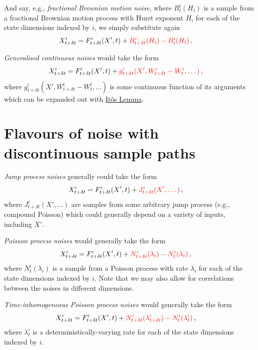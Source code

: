 \documentclass{book}
\begin{document}
And say, e.g., \emph{fractional Brownian motion noise}, where $B^i_{t}({H_i})$ is a sample from a fractional Brownian motion process with Hurst exponent $H_i$ for each of the state dimensions indexed by $i$, we simply substitute again
\begin{align}
& X^i_{t+\delta t} = F^i_{t+\delta t}(X', t) + \textcolor{red}{B^i_{t+\delta t}({H_i})-B^i_{t}({H_i})}\,.
\end{align}

\emph{Generalised continuous noises} would take the form
\begin{align}
& X^i_{t+\delta t} = F^i_{t+\delta t}(X', t) + \textcolor{red}{g^i_{t+\delta t}(X', W^i_{t+\delta t}-W^i_t, \dots)}\,,
\end{align}
where $g^i_{t+\delta t}(X', W^i_{t+\delta t}-W^i_t, \dots)$ is some continuous function of its arguments which can be expanded out with \href{https://en.wikipedia.org/wiki/It\%C3\%B4\%27s_lemma}{Itôs Lemma}.


\section{\sffamily Flavours of noise with discontinuous sample paths}

\emph{Jump process noises} generally could take the form
\begin{align}
& X^i_{t+\delta t} = F^i_{t+\delta t}(X', t) + \textcolor{red}{J^i_{t+\delta t}(X', \dots )}\,,
\end{align}
where $J^i_{t+\delta t}(X', \dots )$ are samples from some arbitrary jump process (e.g., compound Poisson) which could generally depend on a variety of inputs, including $X'$. 

\emph{Poisson process noises} would generally take the form
\begin{align}
& X^i_{t+\delta t} = F^i_{t+\delta t}(X', t) + \textcolor{red}{N^i_{t+\delta t}({\lambda_i})-N^i_{t}({\lambda_i})}\,,
\end{align}
where $N^i_{t}({\lambda_i})$ is a sample from a Poisson process with rate $\lambda_i$ for each of the state dimensions indexed by $i$. Note that we may also allow for correlations between the noises in different dimensions.

\emph{Time-inhomogeneous Poisson process noises} would generally take the form
\begin{align}
& X^i_{t+\delta t} = F^i_{t+\delta t}(X', t) + \textcolor{red}{N^i_{t+\delta t}({\lambda^i_{t+\delta t}})-N^i_{t}({\lambda^i_t})}\,,
\end{align}
where $\lambda^i_{t}$ is a deterministically-varying rate for each of the state dimensions indexed by $i$.
\end{document}

